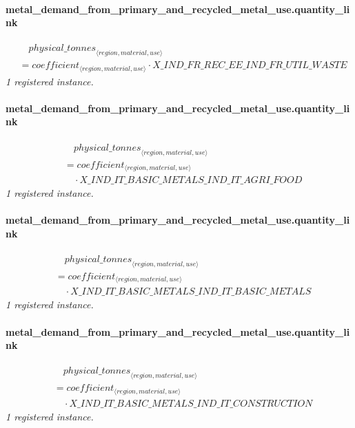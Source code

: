 \documentclass[11pt]{article}
\begin{document}
\paragraph{metal\_demand\_from\_primary\_and\_recycled\_metal\_use.quantity\_link}
\begin{align*}
&\quad {physical\_tonnes}_{\langle region, material, use\rangle}\\
&= coefficient_{\langle region, material, use\rangle} \cdot X\_IND\_FR\_REC\_EE\_IND\_FR\_UTIL\_WASTE
\end{align*}
\noindent\emph{1 registered instance.}\par
\paragraph{metal\_demand\_from\_primary\_and\_recycled\_metal\_use.quantity\_link}
\begin{align*}
&\quad {physical\_tonnes}_{\langle region, material, use\rangle}\\
&= coefficient_{\langle region, material, use\rangle}\\
&\quad {}\cdot X\_IND\_IT\_BASIC\_METALS\_IND\_IT\_AGRI\_FOOD
\end{align*}
\noindent\emph{1 registered instance.}\par
\paragraph{metal\_demand\_from\_primary\_and\_recycled\_metal\_use.quantity\_link}
\begin{align*}
&\quad {physical\_tonnes}_{\langle region, material, use\rangle}\\
&= coefficient_{\langle region, material, use\rangle}\\
&\quad {}\cdot X\_IND\_IT\_BASIC\_METALS\_IND\_IT\_BASIC\_METALS
\end{align*}
\noindent\emph{1 registered instance.}\par
\paragraph{metal\_demand\_from\_primary\_and\_recycled\_metal\_use.quantity\_link}
\begin{align*}
&\quad {physical\_tonnes}_{\langle region, material, use\rangle}\\
&= coefficient_{\langle region, material, use\rangle}\\
&\quad {}\cdot X\_IND\_IT\_BASIC\_METALS\_IND\_IT\_CONSTRUCTION
\end{align*}
\noindent\emph{1 registered instance.}\par
\end{document}
